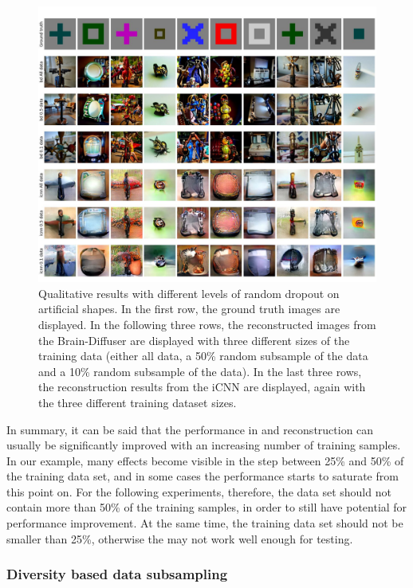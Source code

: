 \begin{figure}[H]
  \centering
  \includegraphics[width=1\textwidth]{plots/dropout_qual_random_art.JPEG}
  \caption[Qualitative results random dropout on artificial shapes]{Qualitative results with different levels of random dropout on artificial shapes. In the first row, the ground truth images are displayed. In the following three rows, the reconstructed images from the Brain-Diffuser are displayed with three different sizes of the training data (either all data, a 50\% random subsample of the data and a 10\% random subsample of the data). In the last three rows, the reconstruction results from the iCNN are displayed, again with the three different training dataset sizes.}\label{fig:dropout_qual_random_art}
\end{figure}


In summary, it can be said that the performance in  and reconstruction can usually be significantly improved with an increasing number of training samples. In our example, many effects become visible in the step between 25\% and 50\% of the training data set, and in some cases the performance starts to saturate from this point on. For the following experiments, therefore, the data set should not contain more than 50\% of the training samples, in order to still have potential for performance improvement. At the same time, the training data set should not be smaller than 25\%, otherwise the  may not work well enough for testing.

\subsubsection{Diversity based data subsampling}

